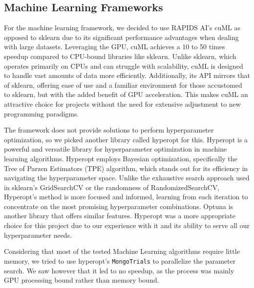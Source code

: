 \documentclass{article}
\begin{document}
    \subsection{Machine Learning Frameworks}
    For the machine learning framework, we decided to use RAPIDS AI’s cuML as opposed to sklearn due to its significant performance advantages when dealing with large datasets.
    Leveraging the GPU, cuML achieves a 10 to 50 times speedup compared to CPU-bound libraries like sklearn.
    Unlike sklearn, which operates primarily on CPUs and can struggle with scalability, cuML is designed to handle vast amounts of data more efficiently.
    Additionally, its API mirrors that of sklearn, offering ease of use and a familiar environment for those accustomed to sklearn, but with the added benefit of GPU acceleration.
    This makes cuML an attractive choice for projects without the need for extensive adjustment to new programming paradigms.

    The framework does not provide solutions to perform hyperparameter optimization, so we picked another library called hyperopt for this.
    Hyperopt is a powerful and versatile library for hyperparameter optimization in machine learning algorithms.
    Hyperopt employs Bayesian optimization, specifically the Tree of Parzen Estimators (TPE) algorithm, which stands out for its efficiency in navigating the hyperparameter space.
    Unlike the exhaustive search approach used in sklearn's GridSearchCV or the randomness of RandomizedSearchCV, Hyperopt's method is more focused and informed, learning from each iteration to concentrate on the most promising hyperparameter combinations.
    Optuna is another library that offers similar features.
    Hyperopt was a more appropriate choice for this project due to our experience with it and its ability to serve all our hyperparameter needs.

    Considering that most of the tested Machine Learning algorithms require little memory, we tried to use hyperopt's \texttt{MongoTrials} to parallelize the parameter search.
    We saw however that it led to no speedup, as the process was mainly GPU processing bound rather than memory bound.
\end{document}
